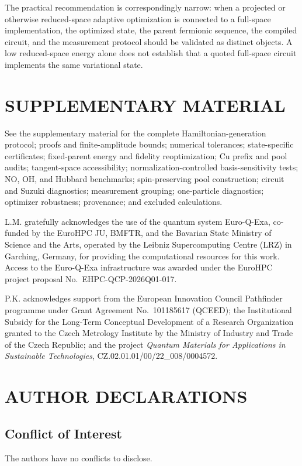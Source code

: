 \documentclass[
 aip,
 jcp,
 amsmath,amssymb,
 preprint
]{revtex4-2}
\begin{document}
The practical recommendation is correspondingly narrow:
when a projected or otherwise reduced-space adaptive optimization is connected to a full-space implementation, the optimized state, the parent fermionic sequence, the compiled circuit, and the measurement protocol should be validated as distinct objects.
A low reduced-space energy alone does not establish that a quoted full-space circuit implements the same variational state.

\section*{SUPPLEMENTARY MATERIAL}
See the supplementary material for the complete Hamiltonian-generation protocol; proofs and finite-amplitude bounds; numerical tolerances; state-specific certificates; fixed-parent energy and fidelity reoptimization; Cu prefix and pool audits; tangent-space accessibility; normalization-controlled basis-sensitivity tests; NO, OH, and Hubbard benchmarks; spin-preserving pool construction; circuit and Suzuki diagnostics; measurement grouping; one-particle diagnostics; optimizer robustness; provenance; and excluded calculations.

\begin{acknowledgments}
L.M. gratefully acknowledges the use of the quantum system Euro-Q-Exa, co-funded by the EuroHPC JU, BMFTR, and the Bavarian State Ministry of Science and the Arts, operated by the Leibniz Supercomputing Centre (LRZ) in Garching, Germany, for providing the computational resources for this work. Access to the Euro-Q-Exa infrastructure was awarded under the EuroHPC project proposal No.~EHPC-QCP-2026Q01-017.

P.K. acknowledges support from the European Innovation Council Pathfinder programme under Grant Agreement No.~101185617 (QCEED); the Institutional Subsidy for the Long-Term Conceptual Development of a Research Organization granted to the Czech Metrology Institute by the Ministry of Industry and Trade of the Czech Republic; and the project \emph{Quantum Materials for Applications in Sustainable Technologies}, CZ.02.01.01/00/22\_008/0004572.
\end{acknowledgments}

\section*{AUTHOR DECLARATIONS}

\subsection*{Conflict of Interest}
The authors have no conflicts to disclose.
\end{document}
